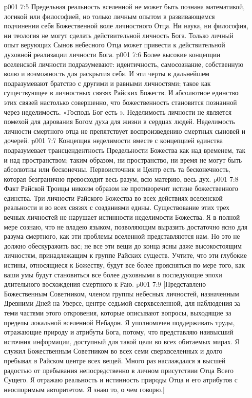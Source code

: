 \vs p001 7:5 Предельная реальность вселенной не может быть познана математикой, логикой или философией, но только личным опытом в развивающемся подчинении себя Божественной воле личностного Отца. Ни наука, ни философия, ни теология не могут сделать действительной личность Бога. Только личный опыт верующих Сынов небесного Отца может привести к действительной духовной реализации личности Бога.
\vs p001 7:6 \pc Более высокие концепции вселенской личности подразумевают: идентичность, самосознание, собственную волю и возможность для раскрытия себя. И эти черты в дальнейшем подразумевают братство с другими и равными личностями; такое как существующее в личностных связях Райских Божеств. И абсолютное единство этих связей настолько совершенно, что божественность становится познанной через неделимость. «Господь Бог есть ». Неделимость личности не является помехой для дарования Богом духа для жизни в сердцах людей. Неделимость личности смертного отца не препятствует воспроизведению смертных сыновей и дочерей.
\vs p001 7:7 Концепция неделимости вместе с концепцией единства подразумевает трансцендентность Предельности Божества как над временем, так и над пространством; таким образом, ни пространство, ни время не могут быть абсолютны или бесконечны. Первоисточник и Центр есть та бесконечность, которая безгранично превосходит весь разум, всю материю, весь дух.
\vs p001 7:8 Факт Райской Троицы никоим образом не противоречит истине божественного единства. Три личности Райского Божества во всех действиях вселенской реальности и во всех связях с созданиями едины. Существование этих трех вечных личностей не нарушает истинности неделимости Божества. Я в полной мере сознаю, что не владею языком, позволяющим выразить достаточно ясно для разума смертного, как эти проблемы вселенной представляются нам. Но это не должно обескуражить вас; не все эти вещи до конца ясны даже высокостоящим личностям, принадлежащим к группе Райских существ. Учтите, что эти глубокие истины, относящиеся к Божеству, будут все более проясняться по мере того, как ваши умы будут становиться все более духовными в последующие эпохи длительного восхождения смертного к Раю.
\vsetoff
\vs p001 7:9 [Представлено Божественным Советником, членом группы небесных личностей, назначенным Древними Дней на Уверсе, центре седьмой сверхвселенной, для наблюдения за теми частями этого откровения, которые описывают вопросы, выходящие за пределы локальной вселенной Небадон. Я уполномочен поддерживать труды, отражающие природу и атрибуты Бога, потому, что представляю наивысший источник информации, доступный для такой цели во всех обитаемых мирах. Я служил Божественным Советником во всех семи сверхвселенных и долго пребывал в Райском центре всех вещей. Много раз наслаждался я высшей радостью от пребывания непосредственно в личном присутствии Отца Всего Сущего. Я отражаю реальность и истинность природы Отца и его атрибутов с неоспоримым авторитетом. Я знаю то, о чем говорю.]
